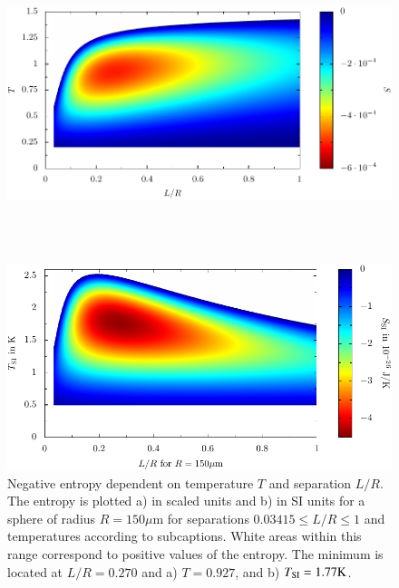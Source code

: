 \begin{figure}[p]
  \begin{minipage}{\linewidth}
  \begin{center}
  \includegraphics[scale=1]{plots/entropy_density_plot/plot_scaled.pdf}
  \end{center}
  \end{minipage}
  \ \\ \ \\
  \begin{minipage}{\linewidth}
  \begin{center}
  \includegraphics[scale=1]{plots/entropy_density_plot/plot_SI.pdf}
  \end{center}
  \end{minipage}

  \caption{Negative entropy dependent on temperature $T$ and separation $L/R$. The entropy
  is plotted a) in scaled units and b) in SI units for a sphere of radius $R=150\mu\mathrm{m}$ for
  separations $0.03415 \le L/R \le 1$ and temperatures according to subcaptions.
  White areas within this range correspond to positive values of the entropy.
  The minimum is located at $L/R=0.270$
  and a) $T=0.927$, and b) $T_{\text{SI}}=1.77\mathrm{K}$.}

  \label{fig:neg_entropies_zoom}
\end{figure}

